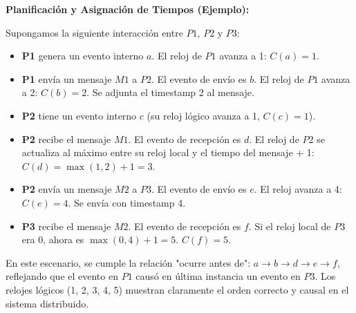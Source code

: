 \documentclass{article}
\begin{document}
\textbf{Planificación y Asignación de Tiempos (Ejemplo):}

Supongamos la siguiente interacción entre $P1$, $P2$ y $P3$:
\begin{itemize}
    \item \textbf{P1} genera un evento interno $a$. El reloj de $P1$ avanza a 1: $C(a) = 1$.
    \item \textbf{P1} envía un mensaje $M1$ a $P2$. El evento de envío es $b$. El reloj de $P1$ avanza a 2: $C(b) = 2$. Se adjunta el timestamp 2 al mensaje.
    \item \textbf{P2} tiene un evento interno $c$ (su reloj lógico avanza a 1, $C(c) = 1$).
    \item \textbf{P2} recibe el mensaje $M1$. El evento de recepción es $d$. El reloj de $P2$ se actualiza al máximo entre su reloj local y el tiempo del mensaje + 1: $C(d) = \max(1, 2) + 1 = 3$.
    \item \textbf{P2} envía un mensaje $M2$ a $P3$. El evento de envío es $e$. El reloj avanza a 4: $C(e) = 4$. Se envía con timestamp 4.
    \item \textbf{P3} recibe el mensaje $M2$. El evento de recepción es $f$. Si el reloj local de $P3$ era 0, ahora es $\max(0, 4) + 1 = 5$. $C(f) = 5$.
\end{itemize}
En este escenario, se cumple la relación "ocurre antes de":
$a \rightarrow b \rightarrow d \rightarrow e \rightarrow f$, reflejando que el evento en $P1$ causó en última instancia un evento en $P3$. Los relojes lógicos (1, 2, 3, 4, 5) muestran claramente el orden correcto y causal en el sistema distribuido.

\clearpage
	
\end{document}
